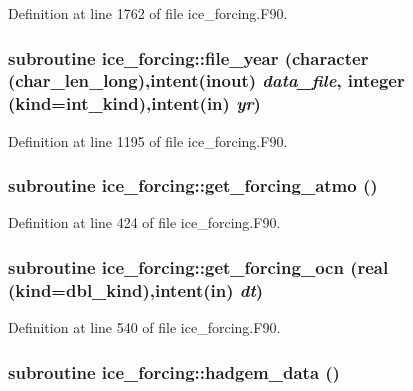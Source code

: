 Definition at line 1762 of file ice\_\-forcing.F90.\hypertarget{namespaceice__forcing_a4dc16c54400bfdb9cdf1298aa63d7c0f}{
\subsubsection[{file\_\-year}]{\setlength{\rightskip}{0pt plus 5cm}subroutine ice\_\-forcing::file\_\-year (character (char\_\-len\_\-long),intent(inout) {\em data\_\-file}, \/  integer (kind=int\_\-kind),intent(in) {\em yr})}}
\label{namespaceice__forcing_a4dc16c54400bfdb9cdf1298aa63d7c0f}


Definition at line 1195 of file ice\_\-forcing.F90.\hypertarget{namespaceice__forcing_ab2f60fb9ecb6411647c4995b88de8732}{
\subsubsection[{get\_\-forcing\_\-atmo}]{\setlength{\rightskip}{0pt plus 5cm}subroutine ice\_\-forcing::get\_\-forcing\_\-atmo ()}}
\label{namespaceice__forcing_ab2f60fb9ecb6411647c4995b88de8732}


Definition at line 424 of file ice\_\-forcing.F90.\hypertarget{namespaceice__forcing_a3c95ab18cff7177ae785d882338cd72e}{
\subsubsection[{get\_\-forcing\_\-ocn}]{\setlength{\rightskip}{0pt plus 5cm}subroutine ice\_\-forcing::get\_\-forcing\_\-ocn (real (kind=dbl\_\-kind),intent(in) {\em dt})}}
\label{namespaceice__forcing_a3c95ab18cff7177ae785d882338cd72e}


Definition at line 540 of file ice\_\-forcing.F90.\hypertarget{namespaceice__forcing_a39483ffb7ca71d3bc78cfb98b9dbbdbc}{
\subsubsection[{hadgem\_\-data}]{\setlength{\rightskip}{0pt plus 5cm}subroutine ice\_\-forcing::hadgem\_\-data ()}}
\label{namespaceice__forcing_a39483ffb7ca71d3bc78cfb98b9dbbdbc}


